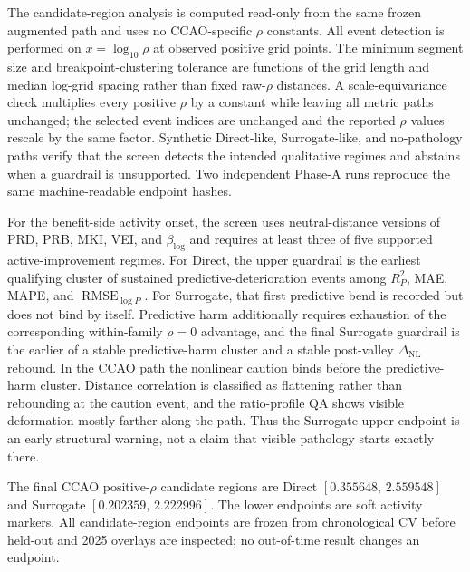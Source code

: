 \documentclass[10pt]{article}
\theoremstyle{definition}
\newcommand{\1}{\mathbf{1}}
\begin{document}
{\color{latestPurple}
The candidate-region analysis is computed read-only from the same frozen augmented path and uses no CCAO-specific $\rho$ constants. All event detection is performed on $x=\log_{10}\rho$ at observed positive grid points. The minimum segment size and breakpoint-clustering tolerance are functions of the grid length and median log-grid spacing rather than fixed raw-$\rho$ distances. A scale-equivariance check multiplies every positive $\rho$ by a constant while leaving all metric paths unchanged; the selected event indices are unchanged and the reported $\rho$ values rescale by the same factor. Synthetic Direct-like, Surrogate-like, and no-pathology paths verify that the screen detects the intended qualitative regimes and abstains when a guardrail is unsupported. Two independent Phase-A runs reproduce the same machine-readable endpoint hashes.

For the benefit-side activity onset, the screen uses neutral-distance versions of PRD, PRB, MKI, VEI, and $\beta_{\log}$ and requires at least three of five supported active-improvement regimes. For Direct, the upper guardrail is the earliest qualifying cluster of sustained predictive-deterioration events among $R^2_P$, MAE, MAPE, and $\operatorname{RMSE}_{\log P}$. For Surrogate, that first predictive bend is recorded but does not bind by itself. Predictive harm additionally requires exhaustion of the corresponding within-family $\rho=0$ advantage, and the final Surrogate guardrail is the earlier of a stable predictive-harm cluster and a stable post-valley $\Delta_{\mathrm{NL}}$ rebound. In the CCAO path the nonlinear caution binds before the predictive-harm cluster. Distance correlation is classified as flattening rather than rebounding at the caution event, and the ratio-profile QA shows visible deformation mostly farther along the path. Thus the Surrogate upper endpoint is an early structural warning, not a claim that visible pathology starts exactly there.

The final CCAO positive-$\rho$ candidate regions are Direct $[0.355648,\,2.559548]$ and Surrogate $[0.202359,\,2.222996]$. The lower endpoints are soft activity markers. All candidate-region endpoints are frozen from chronological CV before held-out and 2025 overlays are inspected; no out-of-time result changes an endpoint.
}

\end{document}
